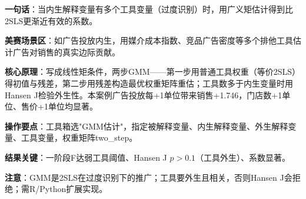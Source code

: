 
\begin{algobrief}
\textbf{一句话}：当内生解释变量有多个工具变量（过度识别）时，用广义矩估计得到比2SLS更渐近有效的系数。

\textbf{美赛场景区}：如广告投放内生，用媒介成本指数、竞品广告密度等多个排他工具估计广告对销售的真实边际贡献。

\textbf{核心原理}：写成线性矩条件，两步GMM——第一步用普通工具权重（等价2SLS）得初值与残差，第二步用残差构造最优权重矩阵重估；工具数多于内生变量时用Hansen J检验外生性。本案例广告投放每+1单位带来销售+1.746，门店数+1单位、售价+1单位均显著。

\textbf{操作要点}：工具箱选"GMM估计"，指定被解释变量、内生解释变量、外生解释变量、工具变量，权重矩阵two\_step。

\textbf{结果关键}：一阶段F达弱工具阈值、Hansen J $p>0.1$（工具外生）、系数显著。

\textbf{注意}：GMM是2SLS在过度识别下的推广；工具要外生且相关，否则Hansen J会拒绝；需R/Python扩展实现。
\end{algobrief}
